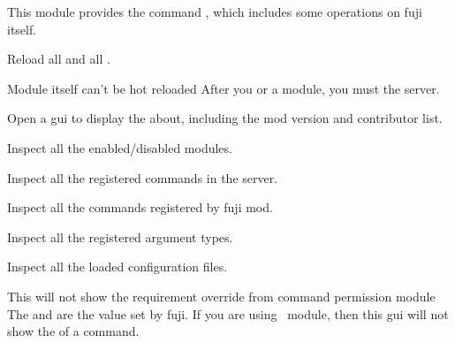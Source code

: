 \label{ch:fuji}

This module provides the command , which includes some operations on fuji itself.

Reload all  and all .

\begin{note}{Module itself can't be hot reloaded}
    After you  or  a module, you must  the server.
\end{note}

Open a gui to display the about, including the mod version and contributor list.

Inspect all the enabled/disabled modules.

Inspect all the registered commands in the server.

Inspect all the commands registered by fuji mod.

Inspect all the registered argument types.

Inspect all the loaded configuration files.

\begin{note}{This will not show the requirement override from command permission module}
    The  and  are the  value set by fuji.
    If you are using~ module, then this gui will not show the  of a command.
\end{note}
